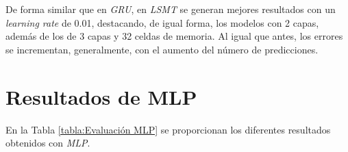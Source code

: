 De forma similar que en \textit{GRU}, en \textit{LSMT} se generan mejores resultados con un 
\textit{learning rate} de 0.01, destacando, de igual forma, los modelos con 2 capas, además
de los de 3 capas y 32 celdas de memoria.
Al igual que antes, los errores se incrementan, generalmente, con el aumento del número de predicciones.

\newpage

\section{Resultados de MLP}
En la Tabla \ref{tabla:Evaluación MLP} se proporcionan los diferentes resultados obtenidos con \textit{MLP}.

